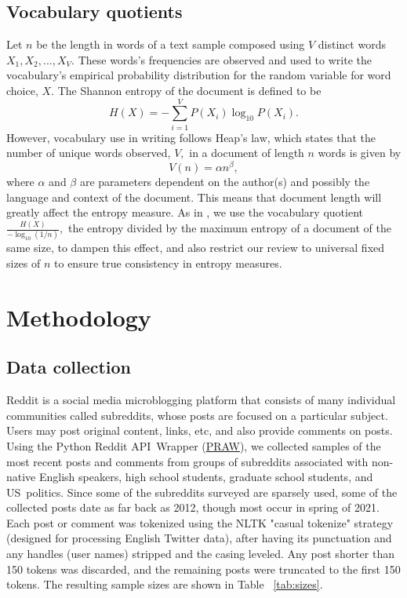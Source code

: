 \documentclass[sigconf]{acmart}
\begin{document}
\subsection{ Vocabulary quotients}

Let $n$ be the length in words of a text sample composed using $V$
distinct words $X_{1},X_{2},...,X_{V}$. These words's frequencies are
observed and used to write the vocabulary's empirical probability
distribution for the random variable for word choice, $X$. The Shannon
entropy of the document is defined to be%
\[
H(X)=-\sum_{i=1}^{V}P(X_{i})\log _{10}P(X_{i}).
\]%
However, vocabulary use in writing follows Heap's law, which states that the
number of unique words observed, $V,$ in a document of length $n$ words is
given by%
\[
V(n)=\alpha n^{\beta },
\]%
where $\alpha $ and $\beta $ are parameters dependent on the author(s) and
possibly the language and context of the document. This means that document
length will greatly affect the entropy measure. As in \cite{dale2000handbook}%
, \cite{rajput2018novel} we use the vocabulary quotient $\frac{H(X)}{-\log
_{10}\left( 1/n\right) },$ the entropy divided by the maximum entropy of a
document of the same size, to dampen this effect, and also restrict our
review to universal fixed sizes of $n$ to ensure true consistency in entropy
measures.

\section{Methodology}

\subsection{Data collection}

Reddit is a social media microblogging platform that consists of many
individual communities called subreddits, whose posts are focused on a
particular subject. Users may post original content, links, etc, and also
provide comments on posts. Using the Python Reddit API\ Wrapper
(\href{https://praw.readthedocs.io/en/latest/}{PRAW}),
we collected samples of the most recent posts and comments from groups of
subreddits associated with non-native English speakers, high school
students, graduate school students, and US\ politics. Since some of the
subreddits surveyed are sparsely used, some of the collected posts date as
far back as 2012, though most occur in spring of 2021. Each post or comment
was tokenized using the NLTK "casual tokenize" strategy (designed for
processing English Twitter data), after having its punctuation and any
handles (user names) stripped and the casing leveled. Any post shorter than
150 tokens was discarded, and the remaining posts were truncated to the
first 150 tokens. The resulting sample sizes are shown in Table ~\ref{tab:sizes}.
\end{document}
